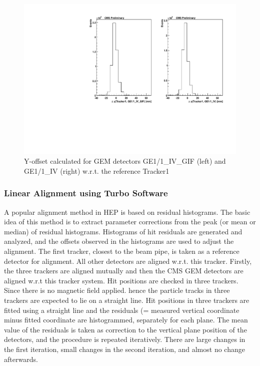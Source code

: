 \begin{figure}[!htbp]
\centering
\includegraphics[width=5.1in]{figures/GEM/Offset_1vsGEM_y_For_Run1897.pdf}
\caption{Y-offset calculated for GEM detectors GE1/1\_IV\_GIF (left) and GE1/1\_IV (right) w.r.t. the reference Tracker1}\label{fig:offGEM2}
\end{figure}



\subsubsection{Linear Alignment using Turbo Software}

A popular alignment method in HEP is based on residual histograms. The basic idea of this method is to extract parameter corrections from the peak (or mean or median) of residual histograms. Histograms of hit residuals are generated and analyzed, and the offsets observed in the histograms are used to adjust the alignment.
The first tracker, closest to the beam pipe, is taken as a reference detector for alignment. All other detectors are aligned w.r.t. this tracker. Firstly, the three trackers are aligned mutually and then the CMS GEM detectors are aligned w.r.t this tracker system. Hit positions are checked in three trackers. Since there is no magnetic field applied. hence the particle tracks in three trackers are expected to lie on a straight line. Hit positions in three trackers are fitted using a straight line and the residuals (= measured vertical coordinate minus fitted coordinate are histogrammed, separately for each plane. The mean value of the residuals is taken as correction to the vertical plane position of the detectors, and the procedure is repeated iteratively. There are large changes in the first iteration, small changes in the second iteration, and almost no change afterwards.

